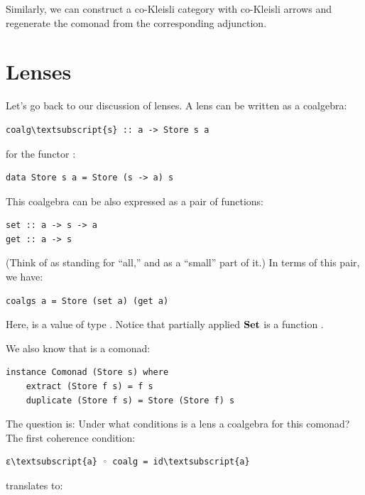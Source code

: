 Similarly, we can construct a co-Kleisli category with co-Kleisli arrows
and regenerate the comonad from the corresponding adjunction.

\section{Lenses}\label{lenses}

Let's go back to our discussion of lenses. A lens can be written as a
coalgebra:

\begin{Verbatim}[commandchars=\\\{\}]
coalg\textsubscript{s} :: a -> Store s a
\end{Verbatim}
for the functor :

\begin{Verbatim}[commandchars=\\\{\}]
data Store s a = Store (s -> a) s
\end{Verbatim}
This coalgebra can be also expressed as a pair of functions:

\begin{Verbatim}[commandchars=\\\{\}]
set :: a -> s -> a
get :: a -> s
\end{Verbatim}
(Think of  as standing for ``all,'' and  as a
``small'' part of it.) In terms of this pair, we have:

\begin{Verbatim}[commandchars=\\\{\}]
coalgs a = Store (set a) (get a)
\end{Verbatim}
Here,  is a value of type . Notice that partially
applied $\mathbf{Set}$ is a function .

We also know that  is a comonad:

\begin{Verbatim}[commandchars=\\\{\}]
instance Comonad (Store s) where
    extract (Store f s) = f s
    duplicate (Store f s) = Store (Store f) s
\end{Verbatim}
The question is: Under what conditions is a lens a coalgebra for this
comonad? The first coherence condition:

\begin{Verbatim}[commandchars=\\\{\}]
ε\textsubscript{a} ◦ coalg = id\textsubscript{a}
\end{Verbatim}
translates to:

